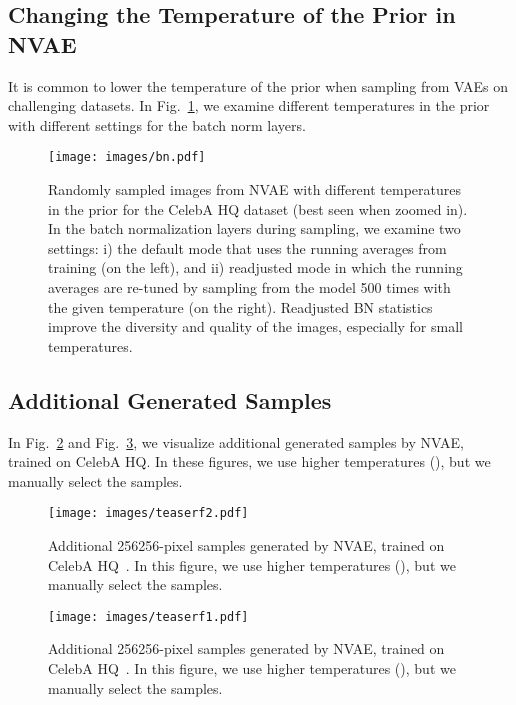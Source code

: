 \documentclass{article}
\begin{document}
\subsection{Changing the Temperature of the Prior in NVAE}\label{app:temp}
It is common to lower the temperature of the prior when sampling from VAEs on challenging datasets. In Fig.~\ref{fig:bn_temp}, we examine different temperatures in the prior with different settings for the batch norm layers.

\begin{figure}
\centering
\texttt{[image: images/bn.pdf]}
\caption{Randomly sampled images from NVAE with different temperatures in the prior for the CelebA HQ dataset (best seen when zoomed in). In the batch normalization layers during sampling, we examine two settings: i) the default mode that uses the running averages from training (on the left), and ii) readjusted mode in which the running averages are re-tuned by sampling from the model 500 times with the given temperature (on the right). Readjusted BN statistics improve the diversity and quality of the images, especially for small temperatures.}
\label{fig:bn_temp}
\end{figure} 
\subsection{Additional Generated Samples}
In Fig.~\ref{fig:more_res1} and Fig.~\ref{fig:more_res2}, we visualize additional generated samples by NVAE, trained on CelebA HQ. In these figures, we use higher temperatures (), but we manually select the samples.

\begin{figure}
\centering
\hspace{-0.9cm}
\texttt{[image: images/teaserf2.pdf]}
\caption{Additional 256256-pixel samples generated by NVAE, trained on CelebA HQ~\cite{karras2018progressive}. In this figure, we use higher temperatures (), but we manually select the samples.}
\label{fig:more_res1}
\vspace{-0.3cm}
\end{figure}

\begin{figure}
\centering
\hspace{-0.9cm}
\texttt{[image: images/teaserf1.pdf]}
\caption{Additional 256256-pixel samples generated by NVAE, trained on CelebA HQ~\cite{karras2018progressive}. In this figure, we use higher temperatures (), but we manually select the samples.}
\label{fig:more_res2}
\vspace{-0.3cm}
\end{figure} 
\end{document}
